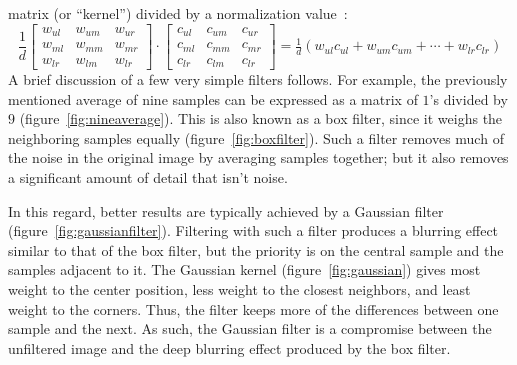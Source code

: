 \documentclass[english,12pt]{ifimaster}
\begin{document}
matrix (or ``kernel'') divided by a normalization
value~\citep{bjorke04:-filter}:
\begin{equation}
  \label{eq:kernel}
  \frac{1}{d}\left[\begin{matrix}
      w_{ul} & w_{um} & w_{ur}\\
      w_{ml} & w_{mm} & w_{mr}\\
      w_{lr} & w_{lm} & w_{lr}
    \end{matrix}\right]
  \cdot
  \left[\begin{matrix}
      c_{ul} & c_{um} & c_{ur}\\
      c_{ml} & c_{mm} & c_{mr}\\
      c_{lr} & c_{lm} & c_{lr}
    \end{matrix}\right]
  = \tfrac{1}{d}(w_{ul}c_{ul} + w_{um}c_{um} + \dotsb + w_{lr}c_{lr})
\end{equation}
A brief discussion of a few very simple filters follows. For example,
the previously mentioned average of nine samples can be expressed as a
matrix of $1$'s divided by $9$ (figure~\ref{fig:nineaverage}). This is
also known as a box filter, since it weighs the neighboring samples
equally (figure~\ref{fig:boxfilter}). Such a filter removes much of
the noise in the original image by averaging samples together; but it
also removes a significant amount of detail that isn't noise.



In this regard, better results are typically achieved by a Gaussian
filter (figure~\ref{fig:gaussianfilter}). Filtering with such a filter
produces a blurring effect similar to that of the box filter, but the
priority is on the central sample and the samples adjacent to it. The
Gaussian kernel (figure~\ref{fig:gaussian}) gives most weight to the
center position, less weight to the closest neighbors, and least
weight to the corners. Thus, the filter keeps more of the differences
between one sample and the next. As such, the Gaussian filter is a
compromise between the unfiltered image and the deep blurring effect
produced by the box filter.
\end{document}
